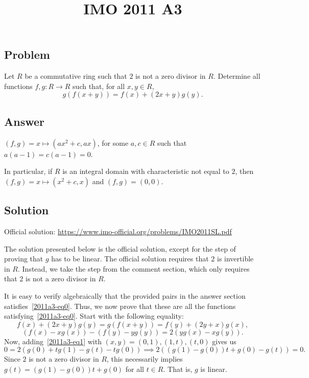 \documentclass{article}
\title{IMO 2011 A3}
\author{}
\date{}
\begin{document}
\maketitle



\subsection*{Problem}

Let $R$ be a commutative ring such that $2$ is not a zero divisor in $R$.
Determine all functions $f, g : R \to R$ such that, for all $x, y \in R$,
\[ g(f(x + y)) = f(x) + (2x + y) g(y). \tag{*}\label{2011a3-eq0} \]



\subsection*{Answer}

$(f, g) = x \mapsto (ax^2 + c, ax)$, for some $a, c \in R$ such that $a(a - 1) = c(a - 1) = 0$.

In particular, if $R$ is an integral domain with characteristic not equal to $2$, then $(f, g) = x \mapsto (x^2 + c, x)$ and $(f, g) = (0, 0)$.



\subsection*{Solution}

Official solution: \url{https://www.imo-official.org/problems/IMO2011SL.pdf}

The solution presented below is the official solution, except for the step of proving that $g$ has to be linear.
The official solution requires that $2$ is invertible in $R$.
Instead, we take the step from the comment section, which only requires that $2$ is not a zero divisor in $R$.

It is easy to verify algebraically that the provided pairs in the answer section satisfies~\eqref{2011a3-eq0}.
Thus, we now prove that these are all the functions satisfying~\eqref{2011a3-eq0}.
Start with the following equality:
\[ f(x) + (2x + y) g(y) = g(f(x + y)) = f(y) + (2y + x) g(x), \]
\[ (f(x) - x g(x)) - (f(y) - y g(y)) = 2(y g(x) - x g(y)). \tag{1}\label{2011a3-eq1} \]
Now, adding~\eqref{2011a3-eq1} with $(x, y) = (0, 1), (1, t), (t, 0)$ gives us
\[ 0 = 2(g(0) + t g(1) - g(t) - t g(0)) \implies 2((g(1) - g(0)) t + g(0) - g(t)) = 0. \]
Since $2$ is not a zero divisor in $R$, this necessarily implies $g(t) = (g(1) - g(0)) t + g(0)$ for all $t \in R$.
That is, $g$ is linear.
\end{document}
